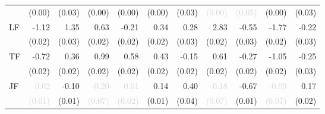 \begin{tabular}{lrrrrrrrrrr}
 &\tiny{(0.00)} &\tiny{(0.03)} &\tiny{(0.00)} &\tiny{(0.00)} &\tiny{(0.00)} &\tiny{(0.03)} &\cellcolor{Gray}\textcolor{LightGray}{\tiny{(0.00)}} &\textcolor{LightGray}{\tiny{(0.05)}} &\tiny{(0.00)} &\tiny{(0.03)}\\[1ex]
\multirow{2}{*}{LF} &-1.12 &1.35 &0.63 &-0.21 &0.34 &0.28 &2.83 &\cellcolor{Gray}-0.55 &-1.77 &-0.22\\
 &\tiny{(0.02)} &\tiny{(0.03)} &\tiny{(0.02)} &\tiny{(0.02)} &\tiny{(0.02)} &\tiny{(0.03)} &\tiny{(0.02)} &\cellcolor{Gray}\tiny{(0.03)} &\tiny{(0.02)} &\tiny{(0.03)}\\[1ex]
\multirow{2}{*}{TF} &-0.72 &0.36 &0.99 &0.58 &0.43 &-0.15 &0.61 &-0.27 &\cellcolor{Gray}-1.05 &-0.25\\
 &\tiny{(0.02)} &\tiny{(0.02)} &\tiny{(0.02)} &\tiny{(0.02)} &\tiny{(0.02)} &\tiny{(0.02)} &\tiny{(0.02)} &\tiny{(0.02)} &\cellcolor{Gray}\tiny{(0.02)} &\tiny{(0.03)}\\[1ex]
\multirow{2}{*}{JF} &\textcolor{LightGray}{0.02} &-0.10 &\textcolor{LightGray}{-0.20} &\textcolor{LightGray}{0.01} &0.14 &0.40 &\textcolor{LightGray}{-0.18} &-0.67 &\textcolor{LightGray}{-0.09} &\cellcolor{Gray}0.17\\
 &\textcolor{LightGray}{\tiny{(0.01)}} &\tiny{(0.01)} &\textcolor{LightGray}{\tiny{(0.07)}} &\textcolor{LightGray}{\tiny{(0.02)}} &\tiny{(0.01)} &\tiny{(0.04)} &\textcolor{LightGray}{\tiny{(0.07)}} &\tiny{(0.01)} &\textcolor{LightGray}{\tiny{(0.07)}} &\cellcolor{Gray}\tiny{(0.02)}\\[1ex]
\bottomrule
\end{tabular}

